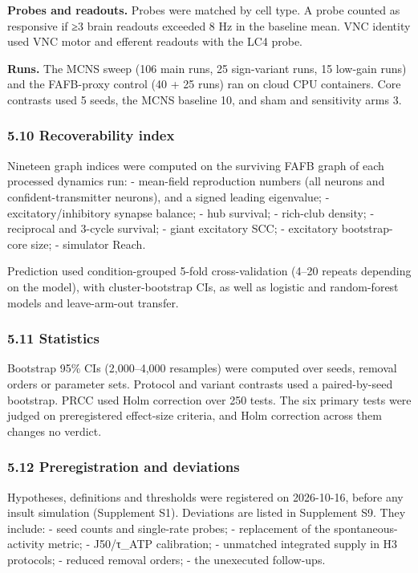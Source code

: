 \documentclass[11pt]{article}
\begin{document}
\textbf{Probes and readouts.} Probes were matched by cell type. A probe counted as responsive if ≥3 brain readouts exceeded 8 Hz in the baseline mean. VNC identity used VNC motor and efferent readouts with the LC4 probe.

\textbf{Runs.} The MCNS sweep (106 main runs, 25 sign-variant runs, 15 low-gain runs) and the FAFB-proxy control (40 + 25 runs) ran on cloud CPU containers. Core contrasts used 5 seeds, the MCNS baseline 10, and sham and sensitivity arms 3.

\subsubsection{5.10 Recoverability index}\label{recoverability-index}

Nineteen graph indices were computed on the surviving FAFB graph of each processed dynamics run:
- mean-field reproduction numbers (all neurons and confident-transmitter neurons), and a signed leading eigenvalue;
- excitatory/inhibitory synapse balance;
- hub survival;
- rich-club density;
- reciprocal and 3-cycle survival;
- giant excitatory SCC;
- excitatory bootstrap-core size;
- simulator Reach.

Prediction used condition-grouped 5-fold cross-validation (4--20 repeats depending on the model), with cluster-bootstrap CIs, as well as logistic and random-forest models and leave-arm-out transfer.

\subsubsection{5.11 Statistics}\label{statistics}

Bootstrap 95\% CIs (2,000--4,000 resamples) were computed over seeds, removal orders or parameter sets. Protocol and variant contrasts used a paired-by-seed bootstrap. PRCC used Holm correction over 250 tests. The six primary tests were judged on preregistered effect-size criteria, and Holm correction across them changes no verdict.

\subsubsection{5.12 Preregistration and deviations}\label{preregistration-and-deviations}

Hypotheses, definitions and thresholds were registered on 2026-10-16, before any insult simulation (Supplement S1). Deviations are listed in Supplement S9. They include:
- seed counts and single-rate probes;
- replacement of the spontaneous-activity metric;
- J50/τ\_ATP calibration;
- unmatched integrated supply in H3 protocols;
- reduced removal orders;
- the unexecuted follow-ups.
\end{document}
